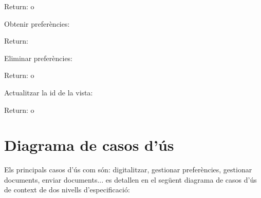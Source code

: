 \documentclass[letterpaper,11pt,catalan]{sphinxmanual}
\begin{document}
Return:  o 

Obtenir preferències:

\begin{sphinxVerbatim}[commandchars=\\\{\}]
 
\end{sphinxVerbatim}

Return:

\begin{sphinxVerbatim}[commandchars=\\\{\}]
   
   
   
   
   
   
\end{sphinxVerbatim}

Eliminar preferències:

\begin{sphinxVerbatim}[commandchars=\\\{\}]
 
\end{sphinxVerbatim}

Return:  o 

Actualitzar la id de la vista:

\begin{sphinxVerbatim}[commandchars=\\\{\}]
 
\end{sphinxVerbatim}

Return:  o 


\section{Diagrama de casos d'ús}
\label{\detokenize{index:diagrama-de-casos-d-us}}
Els principals casos d'ús com són: digitalitzar, gestionar preferències, gestionar documents, enviar documents...
es detallen en el següent diagrama de casos d'ús de context de dos nivells d'especificació:

\end{document}
